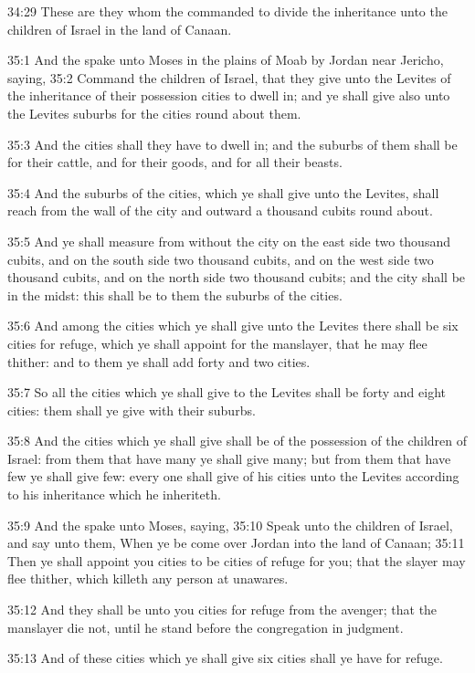 34:29 These are they whom the \LORD commanded to divide the inheritance
unto the children of Israel in the land of Canaan.

35:1 And the \LORD spake unto Moses in the plains of Moab by Jordan
near Jericho, saying, 35:2 Command the children of Israel, that they
give unto the Levites of the inheritance of their possession cities to
dwell in; and ye shall give also unto the Levites suburbs for the
cities round about them.

35:3 And the cities shall they have to dwell in; and the suburbs of
them shall be for their cattle, and for their goods, and for all their
beasts.

35:4 And the suburbs of the cities, which ye shall give unto the
Levites, shall reach from the wall of the city and outward a thousand
cubits round about.

35:5 And ye shall measure from without the city on the east side two
thousand cubits, and on the south side two thousand cubits, and on the
west side two thousand cubits, and on the north side two thousand
cubits; and the city shall be in the midst: this shall be to them the
suburbs of the cities.

35:6 And among the cities which ye shall give unto the Levites there
shall be six cities for refuge, which ye shall appoint for the
manslayer, that he may flee thither: and to them ye shall add forty
and two cities.

35:7 So all the cities which ye shall give to the Levites shall be
forty and eight cities: them shall ye give with their suburbs.

35:8 And the cities which ye shall give shall be of the possession of
the children of Israel: from them that have many ye shall give many;
but from them that have few ye shall give few: every one shall give of
his cities unto the Levites according to his inheritance which he
inheriteth.

35:9 And the \LORD spake unto Moses, saying, 35:10 Speak unto the
children of Israel, and say unto them, When ye be come over Jordan
into the land of Canaan; 35:11 Then ye shall appoint you cities to be
cities of refuge for you; that the slayer may flee thither, which
killeth any person at unawares.

35:12 And they shall be unto you cities for refuge from the avenger;
that the manslayer die not, until he stand before the congregation in
judgment.

35:13 And of these cities which ye shall give six cities shall ye have
for refuge.

